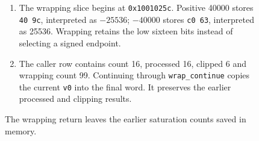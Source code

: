 \begin{figure}[htbp]
\begin{minipage}{\linewidth}
\begin{enumerate}
      \item The wrapping slice begins at \texttt{0x1001025c}. Positive 40000 stores \texttt{40 9c}, interpreted as $-25536$; $-40000$ stores \texttt{c0 63}, interpreted as 25536. Wrapping retains the low sixteen bits instead of selecting a signed endpoint.
      \item The caller row contains count 16, processed 16, clipped 6 and wrapping count 99. Continuing through \texttt{wrap\_continue} copies the current \texttt{v0} into the final word. It preserves the earlier processed and clipping results.
    \end{enumerate}
  \end{minipage}
  \caption{The wrapping return leaves the earlier saturation counts saved in memory.}
  \label{capture:020-pcm-mixing-f02}
  \label{pcm-f02}
\end{figure}
\par

